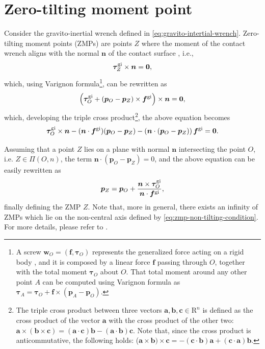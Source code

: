 \section{Zero-tilting moment point}
\label{sec:zero-tilting-moment-point}
Consider the gravito-inertial wrench defined in \ref{eq:gravito-intertial-wrench}. Zero-tilting moment points (ZMPs) are points $Z$ where the moment of the contact wrench aligns with the normal $\bm{n}$ of the contact surface \cite{SardainBessonnet2004}, i.e.,
\begin{equation}
    \label{eq:zmp-non-tilting-condition}
    \bm{\tau}_Z^{\rm gi} \times \bm{n} = \bm{0},
\end{equation}
which, using Varignon formula\footnote{A screw $\bm{w}_O =
(\bm{f},\bm{\tau}_O)$ represents the generalized force acting on a rigid body
\cite{Featherstone2007RigidBodyDynamicsAlgorithms},
and it is composed by a linear force $\bm{f}$ passing through $O$, together with the
total moment $\bm{\tau}_O$ about $O$. That total moment around any other point
$A$ can be computed using Varignon formula as $\bm{\tau}_A=\bm{\tau}_O+\bm{f}\times(\bm{p}_A-\bm{p}_O)$.}, can be rewritten as
\begin{equation*}
    \left(\bm{\tau}_O^{\rm gi} + (\bm{p}_O - \bm{p}_Z) \times \bm{f}^{\rm gi}\right) \times \bm{n} = \bm{0},
\end{equation*}
which, developing the triple cross product\footnote{The triple cross product
between three vectors $\bm{a}, \bm{b}, \bm{c} \in \mathrm{R}^n$ is defined as
the cross product of the vector $\bm{a}$ with the cross product of the other
two: $\bm{a}\times(\bm{b}\times\bm{c})=(\bm{a}\cdot\bm{c})\bm{b}-
(\bm{a}\cdot\bm{b})\bm{c}$. Note that, since the cross product is anticommutative,
the following holds:
($\bm{a}\times\bm{b})\times\bm{c}=-(\bm{c}\cdot\bm{b})\bm{a}+
(\bm{c}\cdot\bm{a})\bm{b}$.}, the above equation becomes
\begin{equation}
    \bm{\tau}_O^{\rm gi} \times \bm{n} - (\bm{n} \cdot \bm{f}^{\rm gi}) (\bm{p}_O - \bm{p}_Z) - \left(\bm{n} \cdot (\bm{p}_O - \bm{p}_Z)\right) \bm{f}^{\rm gi} = \bm{0}.
\end{equation}

Assuming that a point $Z$ lies on a plane with normal $\bm{n}$ intersecting the point $O$, i.e. $Z \in \Pi(O, n)$, the term $\bm{n} \cdot (\bm{p}_O - \bm{p}_Z) = 0$, and the above equation can be easily rewritten as
\begin{equation}
    \bm{p}_Z = \bm{p}_O + \frac{\bm{n} \times \bm{\tau}_O^{\rm gi}}{\bm{n} \cdot \bm{f}^{\rm gi}},
\end{equation}
finally defining the ZMP $Z$. Note that, more in general, there exists an infinity of ZMPs which lie on the non-central axis defined by \eqref{eq:zmp-non-tilting-condition}. For more details, please refer to \cite{SardainBessonnet2004}.

